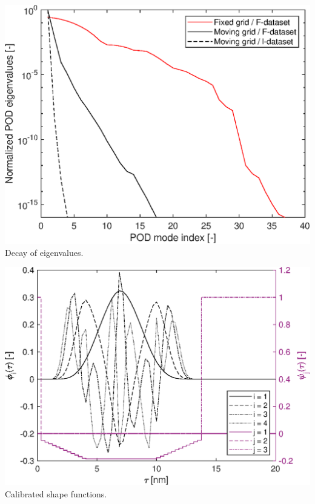 \documentclass[10pt,xcolor=dvipsnames]{beamer}
\begin{document}
\begin{frame}[t]
  \begin{minipage}[t]{0.49\columnwidth}\vskip0pt\centering\small
  \includegraphics[height=0.75\columnwidth,clip]{fig/plugflow_decay.eps}\\
   Decay of eigenvalues.
  \end{minipage}\hfill
  \begin{minipage}[t]{0.49\columnwidth}\vskip0pt\centering\small
  \includegraphics[height=0.75\columnwidth,clip]{fig/plugflow_II_phi.eps}\\
   Calibrated shape functions.
  \end{minipage}\\
    
  
  

\end{frame}
\end{document}
